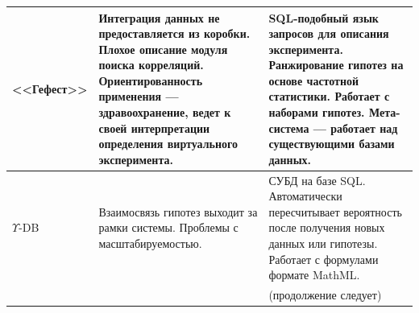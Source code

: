 \begin{table} [ht]
\begin{tabulary}{\textwidth}{@{}>{\zz}L >{\zz}L >{\zz}L@{}}
        \\
        \midrule %
        <<Гефест>> &
        Интеграция данных не предоставляется из коробки. Плохое описание модуля поиска корреляций. 
        Ориентированность применения --- здравоохранение, ведет к своей 
        интерпретации определения виртуального эксперимента. &
        SQL-подобный язык запросов для описания эксперимента. Ранжирование гипотез на основе частотной статистики.
        Работает с наборами гипотез. Мета-система --- работает над существующими базами данных.
        \\
        \midrule
        $\Upsilon$-DB &
        Взаимосвязь гипотез выходит за рамки системы. Проблемы с масштабируемостью. &
        СУБД на базе SQL. Автоматически пересчитывает вероятность после получения новых данных или гипотезы. 
        Работает с формулами формате MathML. 
        \\
        \midrule
        & &  \scriptsize (продолжение следует)
        \\
        \bottomrule %
	\end{tabulary}%
\end{table}

